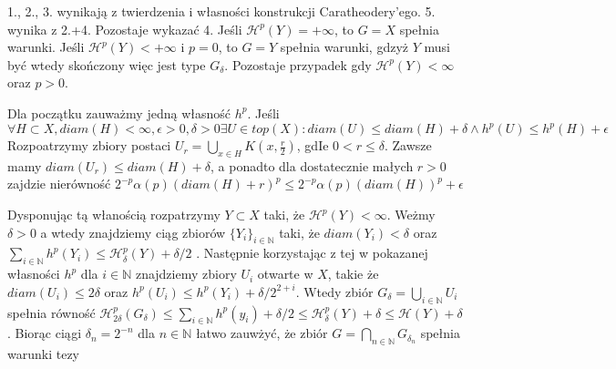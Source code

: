 
1., 2., 3. wynikają z twierdzenia i własności konstrukcji Caratheodery'ego. 5. wynika z 2.+4. Pozostaje wykazać 4.
Jeśli $\mathcal{H}^p(Y) = +\infty$, to $G=X$ spełnia warunki. Jeśli $\mathcal{H}^p(Y) < +\infty$ i $p=0$, to $G=Y$ spełnia warunki, gdzyż $Y$ musi być wtedy skończony więc jest type $G_{\delta}$.
Pozostaje przypadek gdy $\mathcal{H}^p(Y) < \infty$ oraz $p > 0$.\newline

Dla początku zauważmy jedną  własność $h^p$.
Jeśli $\forall H \subset X, diam(H) < \infty, \epsilon > 0, \delta> 0 \exists U \in top(X): diam(U) \leq diam(H) + \delta \wedge h^p(U) \leq h^p(H) + \epsilon$ 
Rozpoatrzymy zbiory postaci $U_r = \bigcup_{x \in H} K(x, \frac{r}{2})$, gdIe $0 < r \leq \delta$. Zawsze mamy $diam(U_r) \leq diam(H) + \delta$, a ponadto dla dostatecznie małych $r>0$ zajdzie nierówność $2^{-p} \alpha(p) (diam(H) + r)^p \leq 2^{-p} \alpha(p)(diam(H))^p + \epsilon$ \newline

Dysponując tą włanością rozpatrzymy $Y \subset X$ taki, że $\mathcal{H}^p(Y) < \infty$. Weżmy $\delta > 0$ a wtedy znajdziemy ciąg zbiorów $\{Y_i\}_{i \in \mathbb{N}}$ taki, że $diam(Y_i) < \delta$ oraz $\sum_{i \in \mathbb{N}} h^p(Y_i) \leq \mathcal{H}^p_{\delta}(Y) + \delta/2$  . Następnie korzystając z tej w pokazanej własności $h^p$ dla $i \in \mathbb{N}$ znajdziemy zbiory $U_i$ otwarte w $X$, takie że $diam(U_i) \leq 2 \delta$ oraz $h^p(U_i) \leq h^p(Y_i) + \delta/ 2^{2+i}$. Wtedy zbiór $G_{\delta} = \bigcup_{i \in \mathbb{N}}U_i$ spełnia równość $\mathcal{H}_{2\delta}^p(G_{\delta}) \leq \sum_{i \in \mathbb{N}} h^p(y_i) + \delta/2 \leq \mathcal{H}^p_{\delta}(Y) + \delta \leq \mathcal{H}(Y) + \delta$ .  Biorąc ciągi  $\delta_n = 2^{-n}$ dla $n \in \mathbb{N}$ łatwo zauwżyć, że zbiór $G = \bigcap_{n \in \mathbb{N}} G_{\delta_n}$ spełnia warunki tezy 
